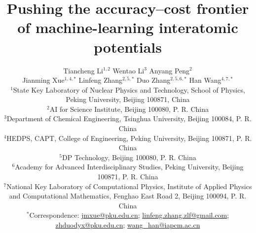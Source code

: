 \documentclass[11pt]{article}
\title{
Pushing the accuracy--cost frontier of machine-learning interatomic potentials
}
\author{
    \begin{minipage}{0.95\textwidth}
        \centering
        Tiancheng Li$^{1,2}$ \quad
        Wentao Li$^{3}$ \quad
        Anyang Peng$^{2}$\\
        Jianming Xue$^{1,4,*}$ \quad
        Linfeng Zhang$^{2,5,*}$ \quad
        Duo Zhang$^{2,5,6,*}$ \quad
        Han Wang$^{4,7,*}$ \\[0.6em]
        {\normalfont\small
            $^{1}$State Key Laboratory of Nuclear Physics and Technology, School of Physics, Peking University, Beijing 100871, China\\
            $^{2}$AI for Science Institute, Beijing 100080, P. R. China\\
            $^{3}$Department of Chemical Engineering, Tsinghua University, Beijing 100084, P. R. China\\
            $^{4}$HEDPS, CAPT, College of Engineering, Peking University, Beijing 100871, P. R. China\\
            $^{5}$DP Technology, Beijing 100080, P. R. China\\
            $^{6}$Academy for Advanced Interdisciplinary Studies, Peking University, Beijing 100871, P. R. China\\
            $^{7}$National Key Laboratory of Computational Physics, Institute of Applied Physics and Computational Mathematics, Fenghao East Road 2, Beijing 100094, P. R. China\\
            $^{*}$Correspondence: \href{mailto:jmxue@pku.edu.cn}{jmxue@pku.edu.cn};
            \href{mailto:linfeng.zhang.zlf@gmail.com}{linfeng.zhang.zlf@gmail.com};
            \href{mailto:zhduodyx@pku.edu.cn}{zhduodyx@pku.edu.cn};
            \href{mailto:wang_han@iapcm.ac.cn}{wang\_han@iapcm.ac.cn}
        }
    \end{minipage}
}
\date{}
\begin{document}
\raggedbottom
\maketitle













\end{document}
